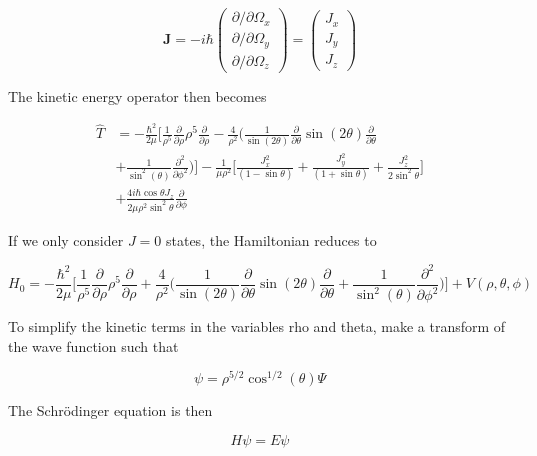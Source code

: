 \documentclass{article}
\begin{document}
\begin{equation}
	\bm{J} = 
	-i\hbar
	\begin{pmatrix}
	\partial/\partial\Omega_x\\
	\partial/\partial\Omega_y\\
	\partial/\partial\Omega_z
	\end{pmatrix}
	=
	\begin{pmatrix}
	J_x\\
	J_y\\
	J_z
	\end{pmatrix}
\end{equation}

The kinetic energy operator then becomes

\begin{align*}
	\hat{T} &=-\frac{\hbar^2}{2\mu}\Bigg[\frac{1}{\rho^5}\frac{\partial}{\partial\rho}\rho^5\frac{\partial}{\partial\rho} - \frac{4}{\rho^2}\Bigg(\frac{1}{\sin(2\theta)}\frac{\partial}{\partial\theta}\sin(2\theta)\frac{\partial}{\partial\theta}\\
	&+\frac{1}{\sin^2(\theta)}\frac{\partial^2}{\partial\phi^2} \Bigg)\Bigg]-\frac{1}{\mu\rho^2}\Bigg[\frac{J^2_x}{(1-\sin\theta)} + \frac{J^2_y}{(1+\sin\theta)} +\frac{J^2_z}{2\sin^2\theta}\Bigg]\\
	&+ \frac{4i\hbar\cos\theta J_z}{2\mu\rho^2\sin^2\theta}\frac{\partial}{\partial\phi}
\end{align*}

If we only consider $J=0$ states, the Hamiltonian reduces to 

\begin{equation}
H_{0} = -\frac{\hbar^{2}}{2 \mu} \Bigg[ \frac{1}{\rho^{5}} \frac{\partial}{\partial \rho} \rho^{5} \frac{\partial}{\partial \rho} + \frac{4}{\rho^{2}}\Big( \frac{1}{\sin(2\theta)} \frac{\partial}{\partial \theta} \sin(2\theta) \frac{\partial}{\partial \theta} + \frac{1}{\sin^{2}(\theta)} \frac{\partial^{2}}{\partial \phi^{2}} \Big) \Bigg] + V(\rho, \theta, \phi)
\end{equation}

To simplify the kinetic terms in the variables rho and theta, make a transform of the wave function such that

\begin{equation}
\psi = \rho^{5/2} \cos^{1/2}(\theta) \Psi
\end{equation}

The Schr{\"o}dinger equation is then

\begin{equation}
H \psi = E \psi 
\end{equation}
\end{document}
